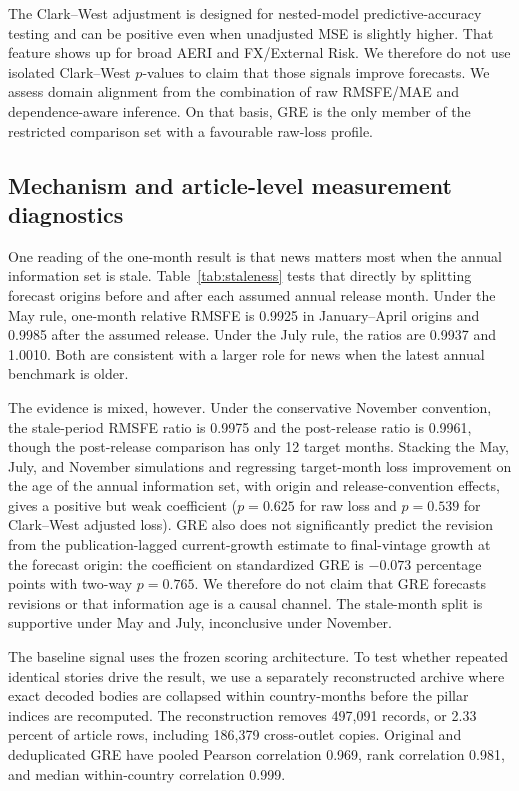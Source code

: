 \documentclass[preprint,12pt,authoryear]{elsarticle}
\begin{document}


The Clark--West adjustment is designed for nested-model predictive-accuracy
testing and can be positive even when unadjusted MSE is slightly higher. That
feature shows up for broad AERI and FX/External Risk. We therefore do not use
isolated Clark--West $p$-values to claim that those signals improve forecasts.
We assess domain alignment from the combination of raw RMSFE/MAE and
dependence-aware inference. On that basis, GRE is the only member of the
restricted comparison set with a favourable raw-loss profile.

\subsection{Mechanism and article-level measurement diagnostics}

One reading of the one-month result is that news matters most when the annual
information set is stale. Table~\ref{tab:staleness} tests that directly by
splitting forecast origins before and after each assumed annual release month.
Under the May rule, one-month relative RMSFE is 0.9925 in January--April
origins and 0.9985 after the assumed release. Under the July rule, the ratios
are 0.9937 and 1.0010. Both are consistent with a larger role for news when
the latest annual benchmark is older.



The evidence is mixed, however. Under the conservative November convention, the
stale-period RMSFE ratio is 0.9975 and the post-release ratio is 0.9961,
though the post-release comparison has only 12 target months. Stacking the
May, July, and November simulations and regressing target-month loss
improvement on the age of the annual information set, with origin and
release-convention effects, gives a positive but weak coefficient
($p = 0.625$ for raw loss and $p = 0.539$ for Clark--West adjusted loss). GRE
also does not significantly predict the revision from the publication-lagged
current-growth estimate to final-vintage growth at the forecast origin: the
coefficient on standardized GRE is $-0.073$ percentage points with two-way
$p = 0.765$. We therefore do not claim that GRE forecasts revisions or that
information age is a causal channel. The stale-month split is supportive under
May and July, inconclusive under November.

The baseline signal uses the frozen scoring architecture. To test whether
repeated identical stories drive the result, we use a separately reconstructed
archive where exact decoded bodies are collapsed within country-months before
the pillar indices are recomputed. The reconstruction removes 497,091 records,
or 2.33 percent of article rows, including 186,379 cross-outlet copies.
Original and deduplicated GRE have pooled Pearson correlation 0.969, rank
correlation 0.981, and median within-country correlation 0.999.
\end{document}
